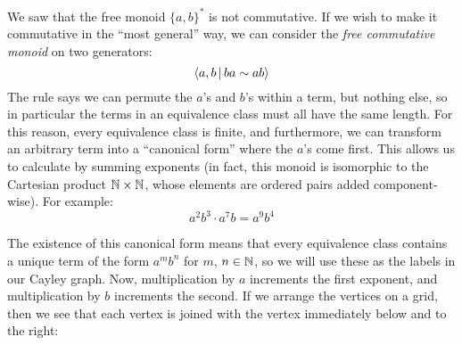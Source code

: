 \documentclass[../generics]{subfiles}
\begin{document}
\begin{example}
\begin{center}
\end{center}
\end{example}

\begin{example}\label{commutative free monoid example}
We saw that the free monoid $\{a,b\}^*$ is not commutative. If we wish to make it commutative in the ``most general'' way, we can consider the \emph{free commutative monoid} on two generators:
\[\langle a,b\,|\,ba\sim ab\rangle\]
The rule says we can permute the $a$'s and $b$'s within a term, but nothing else, so in particular the terms in an equivalence class must all have the same length. For this reason, every equivalence class is finite, and furthermore, we can transform an arbitrary term into a ``canonical form'' where the $a$'s come first. This allows us to calculate by summing exponents (in fact, this monoid is isomorphic to the Cartesian product $\mathbb{N}\times\mathbb{N}$, whose elements are ordered pairs added component-wise). For example:
\[a^2 b^3 \cdot a^7 b = a^9 b^4\]

The existence of this canonical form means that every equivalence class contains a unique term of the form $a^mb^n$ for $m$, $n\in\mathbb{N}$, so we will use these as the labels in our Cayley graph. Now, multiplication by $a$ increments the first exponent, and multiplication by $b$ increments the second. If we arrange the vertices on a grid, then we see that each vertex is joined with the vertex immediately below and to the right:

\begin{center}
\end{center}
\end{example}
\end{document}
